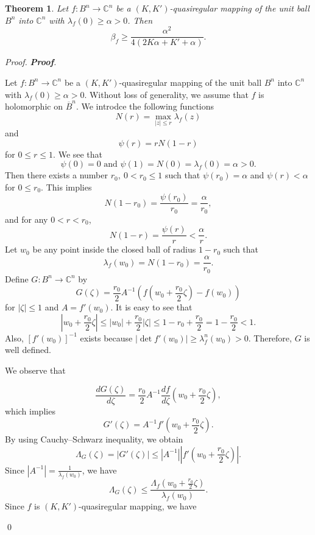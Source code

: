 \documentclass[a4paper,12pt,reqno]{amsart}
\theoremstyle{plain}
\newtheorem{thm}{Theorem}
\theoremstyle{definition}
\newenvironment{pf}[1][]{%
	\vskip 3mm
	\noindent
	\ifthenelse{\equal{#1}{}}%
	{{\slshape Proof. }}%
	{{\slshape #1.} }%
}%
{\qed\bigskip}
\newcommand{\IC}{{\mathbb C}}
\numberwithin{equation}{section}
\begin{document}
\begin{thm}\label{Rohi-Vasu-P2-Theorem-002}
Let $f:B^n\to \IC^n$ be a $(K,K')$-quasiregular mapping of the unit ball $B^n$ into $\IC^n$ with $\lambda_f(0)\geq \alpha>0$. Then
$$\beta_f\geq \frac{\alpha^2}{4(2K\alpha+K'+\alpha)}.$$ 
\end{thm}
\begin{pf}[{\bf Proof}]
Let $f:B^n\to \IC^n$ be a $(K,K')$-quasiregular mapping of the unit ball $B^n$ into $\IC^n$ with $\lambda_f(0)\geq \alpha>0$. Without loss of generality, we assume that $f$ is holomorphic on $\overline{B}^n$. We introdce the following functions
$$N(r)=\max_{|z|\leq r}\lambda_f(z)$$
and
$$\psi(r)=rN(1-r)$$
for $0\leq r\leq1.$
We see that
 $$ \psi(0)=0 \text{ and  }\psi(1)=N(0)=\lambda_f(0)=\alpha>0.$$
Then there exists a number $r_0, \ 0<r_0\leq 1$ such that $\psi(r_0)=\alpha$ and $\psi(r)<\alpha$ for $0\leq r_0. $ This implies 
      $$N(1-r_0)=\frac{\psi(r_0)}{r_0}=\frac{\alpha}{r_0},$$
and for any $0<r<r_0$,
\begin{equation}\label{Rohi-Vasu-P2-equation-007}
 N(1-r)=\frac{\psi(r)}{r}<\frac{\alpha}{r}.
\end{equation}
Let $w_0$ be any point inside the closed ball of radius $1-r_0$ such that
$$\lambda_f(w_0)=N(1-r_0)=\frac{\alpha}{r_0}.$$
Define $G:B^n\to \IC^n$ by
\begin{equation}\label{Rohi-Vasu-P2-equation-007-a}
G(\zeta)=\frac{r_0}{2}A^{-1}\left(f(w_0+\frac{r_0}{2}\zeta)-f(w_0)\right)
\end{equation}
for $|\zeta|\leq 1$ and $A=f'(w_0).$ It is easy to see that $$|w_0+\frac{r_0}{2}\zeta|\leq |w_0|+\frac{r_0}{2}|\zeta|\leq 1-r_0+\frac{r_0}{2}=1-\frac{r_0}{2}<1.$$
Also, $[f'(w_0)]^{-1}$ exists because $|\operatorname{det} f'(w_0)|\geq \lambda_f^n(w_0)>0.$ Therefore, $G$ is well defined.
\vspace{1mm}
\begin{flushleft}
We observe that 
\end{flushleft}
$$\frac{dG(\zeta)}{d\zeta}=\frac{r_0}{2}A^{-1}\frac{df}{d\zeta}\left(w_0+\frac{r_0}{2}\zeta\right), $$
which implies
\begin{equation}\label{Rohi-Vasu-P2-equation-007-b}
G'(\zeta)=A^{-1}f'(w_0+\frac{r_0}{2}\zeta).
\end{equation}
By using Cauchy–Schwarz inequality, we obtain
$$\Lambda_G(\zeta)=|G'(\zeta)|\leq |A^{-1}||f'(w_0+\frac{r_0}{2}\zeta)|.$$
Since $|A^{-1}|=\frac{1}{\lambda_f(w_0)}$, we have
$$\Lambda_G(\zeta)\leq \frac{\Lambda_f(w_0+\frac{r_0}{2}\zeta)}{\lambda_f(w_0)}.$$
Since $f$ is $(K,K')$-quasiregular mapping, we have 

\end{pf}
\end{document}
